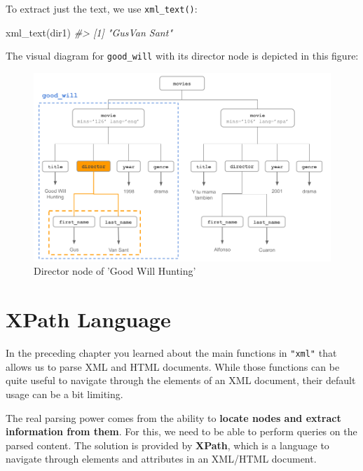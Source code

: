 \documentclass[
]{book}
\newenvironment{Shaded}{\begin{snugshade}}{\end{snugshade}}
\newcommand{\CommentTok}[1]{\textcolor[rgb]{0.56,0.35,0.01}{\textit{#1}}}
\newcommand{\FunctionTok}[1]{\textcolor[rgb]{0.00,0.00,0.00}{#1}}
\newcommand{\NormalTok}[1]{#1}
\begin{document}
To extract just the text, we use \texttt{xml\_text()}:

\begin{Shaded}
\begin{Highlighting}[]
\FunctionTok{xml\_text}\NormalTok{(dir1)}
\CommentTok{\#\textgreater{} [1] "GusVan Sant"}
\end{Highlighting}
\end{Shaded}

The visual diagram for \texttt{good\_will} with its director node is depicted in this
figure:

\begin{figure}

{\centering \includegraphics[width=0.85\linewidth]{images/xml/xml-movies-tree4} 

}

\caption{Director node of 'Good Will Hunting'}\label{fig:unnamed-chunk-48}
\end{figure}

\hypertarget{xpath}{%
\chapter{XPath Language}\label{xpath}}

In the preceding chapter you learned about the main functions in \texttt{"xml"} that
allows us to parse XML and HTML documents. While those functions can be quite
useful to navigate through the elements of an XML document, their default usage
can be a bit limiting.

The real parsing power comes from the ability to
\textbf{locate nodes and extract information from them}. For this, we need to be
able to perform queries on the parsed content. The solution is provided by
\textbf{XPath}, which is a language to navigate through elements and attributes in
an XML/HTML document.
\end{document}
